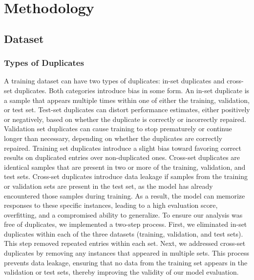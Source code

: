 \section{Methodology}\label{Methodology}

\subsection{Dataset}

\subsubsection{Types of Duplicates}
A training dataset can have two types of duplicates: in-set duplicates and cross-set duplicates. Both categories introduce bias in some form.
An in-set duplicate is a sample that appears multiple times within one of either the training, validation, or test set.
Test-set duplicates can distort performance estimates, either positively or negatively, based on whether the duplicate is correctly or incorrectly repaired. 
Validation set duplicates can cause training to stop prematurely or continue longer than necessary, depending on whether the duplicates are correctly repaired.
Training set duplicates introduce a slight bias toward favoring correct results on duplicated entries over non-duplicated ones.
Cross-set duplicates are identical samples that are present in two or more of the training, validation, and test sets.
Cross-set duplicates introduce data leakage if samples from the training or validation sets are present in the test set, as the model has already encountered those samples during training.
As a result, the model can memorize responses to these specific instances, leading to a high evaluation score, overfitting, and a compromised ability to generalize.
To ensure our analysis was free of duplicates, we implemented a two-step process.
First, we eliminated in-set duplicates within each of the three datasets (training, validation, and test sets).
This step removed repeated entries within each set.
Next, we addressed cross-set duplicates by removing any instances that appeared in multiple sets.
This process prevents data leakage, ensuring that no data from the training set appears in the validation or test sets, thereby improving the validity of our model evaluation.

